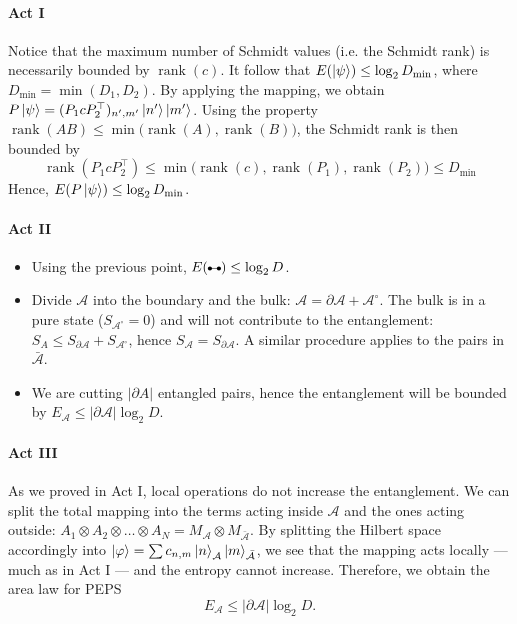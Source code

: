 \documentclass[a4paper,10pt,twoside]{article}
\def \A {\mathcal{A}}
\DeclareMathOperator{\rank}{rank}
\def\pair{\tikz[baseline=-0.5ex]{
\fill (0,0) circle (1.5pt) coordinate (A);
\fill (1.5ex,0) circle (1.5pt) coordinate (B);
\draw (A)--(B);}
}
\begin{document}
\begin{section}{}
\paragraph{Act I} 
Notice that the maximum number of Schmidt values (i.e. the Schmidt rank) is necessarily bounded by $\rank(c)$.
It follow that $E(\ket{\psi}) \leq \log_2 D_{\min}$, where $D_{\min} = \min(D_1,D_2)$.
By applying the mapping, we obtain $P\ket{\psi} = (P_1 c P_2^\top)_{n^\prime,m^\prime} \ket{n^\prime}\ket{m^\prime}$.
Using the property $\rank(AB) \leq \min\big(\rank(A),\rank(B)\big)$, the Schmidt rank is then bounded by 
\[
  \rank(P_1 c P_2^\top) \leq \min\big(\rank(c),\rank(P_1),\rank(P_2)\big) \leq D_{\min}
\]
Hence, $E(P\ket{\psi}) \leq \log_2 D_{\min}$.

\paragraph{Act II}
\begin{itemize}
  \item Using the previous point, $E(\pair) \leq \log_2 D$.
  \item Divide $\A$ into the boundary and the bulk: $\A = \partial \A + \A^\circ$.
  The bulk is in a pure state ($S_{\A^\circ} = 0$) and will not contribute to the entanglement: $S_A \leq S_{\partial \A} + S_{\A^\circ}$, hence $S_\A = S_{\partial\A} $. 
  A similar procedure applies to the pairs in $\bar{\A}$.
  \item We are cutting $|\partial A|$ entangled pairs, hence the entanglement will be bounded by $E_\A \leq |\partial \A| \log_2 D$.
\end{itemize} 

\paragraph{Act III} As we proved in Act I, local operations do not increase the entanglement.
We can split the total mapping into the terms acting inside $\A$ and the ones acting outside: $A_1 \otimes A_2 \otimes \dots \otimes A_N = M_\A \otimes M_{\bar{\A}}$.
By splitting the Hilbert space accordingly into $\ket{\varphi} = \sum c_{n,m} \ket{n}_\A \ket{m}_{\bar{\A}}$, we see that the mapping acts locally --- much as in Act I --- and the entropy cannot increase. 
Therefore, we obtain the area law for PEPS 
\[ 
  E_\A \leq |\partial \A| \log_2 D.
\]

\end{section}
\end{document}
